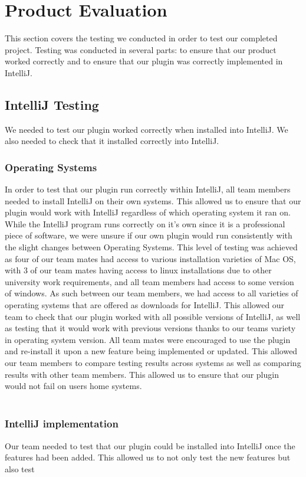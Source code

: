 \documentclass{l3proj}
\begin{document}
\section{Product Evaluation}
This section covers the testing we conducted in order to test our completed project. Testing was conducted in several parts: to ensure that our product worked correctly and to ensure that our plugin was correctly implemented in IntelliJ.

\subsection{IntelliJ Testing}
We needed to test our plugin worked correctly when installed into IntelliJ. We also needed to check that it installed correctly into IntelliJ. \\

\subsubsection{Operating Systems}
In order to test that our plugin run correctly within IntelliJ, all team members needed to install IntelliJ on their own systems. This allowed us to ensure that our plugin would work with IntelliJ regardless of which operating system it ran on. While the IntelliJ program runs correctly on it's own since it is a professional piece of software, we were unsure if our own plugin would run consistently with the slight changes between Operating Systems. This level of testing was achieved as four of our team mates had access to various installation varieties of Mac OS, with 3 of our team mates having access to linux installations due to other university work requirements, and all team members had access to some version of windows. As such between our team members, we had access to all varieties of operating systems that are offered as downloads for IntelliJ. This allowed our team to check that our plugin worked with all possible versions of IntelliJ, as well as testing that it would work with previous versions thanks to our teams variety in operating system version. All team mates were encouraged to use the plugin and re-install it upon a new feature being implemented or updated. This allowed our team members to compare testing results across systems as well as comparing results with other team members. This allowed us to ensure that our plugin would not fail on users home systems.\\
\\
\subsubsection{IntelliJ implementation}
Our team needed to test that our plugin could be installed into IntelliJ once the features had been added. This allowed us to not only test the new features but also test
\end{document}
